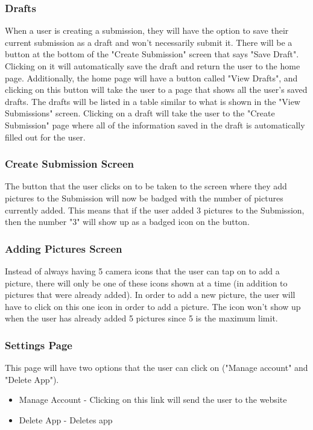 \documentclass[onecolumn, draftclsnofoot,10pt, compsoc]{IEEEtran}
\begin{document}
\subsubsection{Drafts}
When a user is creating a submission, they will have the option to save their current submission as a draft and won't necessarily submit it. There will be a button at the bottom of the "Create Submission" screen that says "Save Draft". Clicking on it will automatically save the draft and return the user to the home page. Additionally, the home page will have a button called "View Drafts", and clicking on this button will take the user to a page that shows all the user's saved drafts. The drafts will be listed in a table similar to what is shown in the "View Submissions" screen. Clicking on a draft will take the user to the "Create Submission" page where all of the information saved in the draft is automatically filled out for the user.

\subsubsection{Create Submission Screen}
The button that the user clicks on to be taken to the screen where they add pictures to the Submission will now be badged with the number of pictures currently added. This means that if the user added 3 pictures to the Submission, then the number "3" will show up as a badged icon on the button.

\subsubsection{Adding Pictures Screen}
Instead of always having 5 camera icons that the user can tap on to add a picture, there  will only be one of these icons shown at a time (in addition to pictures that were already added). In order to add a new picture, the user will have to click on this one icon in order to add a picture. The icon won't show up when the user has already added 5 pictures since 5 is the maximum limit.

\subsubsection{Settings Page}
This page will have two options that the user can click on ("Manage account" and "Delete App").
\begin{itemize}
\item Manage Account - Clicking on this link will send the user to the website
\item Delete App - Deletes app
\end{itemize}
\end{document}
